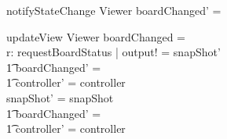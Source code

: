 \documentclass[a4paper,11pt]{article}
\begin{document}
\begin{schema}{notifyStateChange}
\Delta Viewer 
\where
boardChanged' = \true
\end{schema}

\begin{schema}{updateView}
\Delta Viewer
\where
\IF boardChanged = \true \\
\THEN \exists r: requestBoardStatus | output! = snapShot' \\ \t1
boardChanged' = \false \\ \t1
controller' = controller \\ 
\ELSE snapShot' = snapShot \\ \t1
boardChanged' = \false \\ \t1
controller' = controller
\end{schema}
\end{document}
